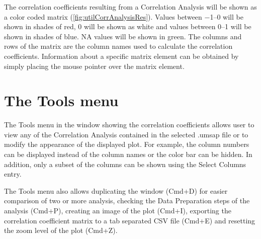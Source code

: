 The correlation coefficients resulting from a Correlation Analysis will be shown
as a color coded matrix (\autoref{fig:utilCorrAnalysisRes}). Values between \numrange{-1}{0}
will be shown in shades of red, \num{0} will be shown as white and values between
\numrange{0}{1} will be shown in shades of blue. NA values will be shown in green.
The columns and rows of the matrix are the column names used to calculate the correlation
coefficients. Information about a specific matrix element can be obtained by simply
placing the mouse pointer over the matrix element.

\section{The Tools menu}

The Tools menu in the window showing the correlation coefficients allows user to
view any of the Correlation Analysis contained in the selected .umsap file or to
modify the appearance of the displayed plot. For example, the column numbers can
be displayed instead of the column names or the color bar can be hidden. In addition,
only a subset of the columns can be shown using the Select Columns entry.

The Tools menu also allows duplicating the window (Cmd+D) for easier comparison of
two or more analysis, checking the Data Preparation steps of the analysis (Cmd+P),
creating an image of the plot (Cmd+I), exporting the correlation coefficient matrix
to a tab separated CSV file (Cmd+E) and resetting the zoom level of the plot (Cmd+Z).

